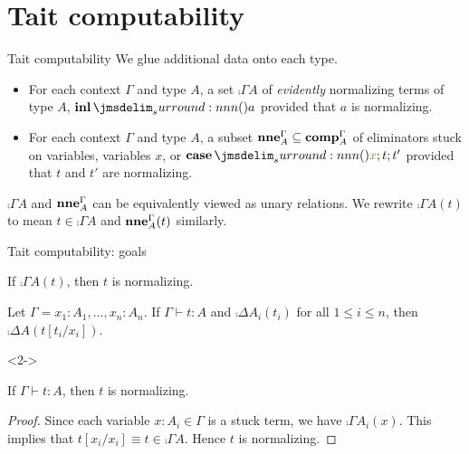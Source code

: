 \documentclass{beamer}
\begin{document}
\section{Tait computability}

\begin{frame}{Tait computability}
  We glue additional data onto each type.
  \begin{itemize}
  \item For each context $\Gamma$ and type $A$, a set $\comp{\Gamma}{A}$ of \emph{evidently} normalizing terms of type $A$, \eg $\tmInl{a}$ provided that $a$ is normalizing.
  \item For each context $\Gamma$ and type $A$, a subset $\operatorname{\mathbf{nne}}^{\Gamma}_{A} \subseteq \operatorname{\mathbf{comp}}^{\Gamma}_{A}$ of eliminators stuck on variables, \eg variables $x$, or $\tmCase{x}{t}{t'}$ provided that $t$ and $t'$ are normalizing.
  \end{itemize}
  \begin{remark}
    $\comp{\Gamma}{A}$ and $\operatorname{\mathbf{nne}}^{\Gamma}_{A}$ can be equivalently viewed as unary relations.
    We rewrite $\comp{\Gamma}{A}(t)$ to mean $t \in \comp{\Gamma}{A}$ and $\operatorname{\mathbf{nne}}^{\Gamma}_{A}(t)$ similarly.
  \end{remark}
\end{frame}

\begin{frame}{Tait computability: goals}
  \begin{theorem}
    If $\comp{\Gamma}{A}(t)$, then $t$ is normalizing.
  \end{theorem}
  \begin{theorem}
    Let $\Gamma = x_1 : A_1,\ldots,x_n : A_n$.
    If $\Gamma \vdash t : A$ and $\comp{\Delta}{A_i}(t_i)$ for all $1 \leq i \leq n$, then $\comp{\Delta}{A}(t[t_i/x_i])$.
  \end{theorem}
  \begin{uncoverenv}<2->
    \begin{corollary}[Normalization]
      If $\Gamma \vdash t : A$, then $t$ is normalizing.
    \end{corollary}
    \begin{proof}
      Since each variable $x : A_i \in \Gamma$ is a stuck term, we have $\comp{\Gamma}{A_i}(x)$.
      This implies that $t[x_i/x_i] \equiv t \in \comp{\Gamma}{A}$.
      Hence $t$ is normalizing.
    \end{proof}
  \end{uncoverenv}
\end{frame}
\end{document}
